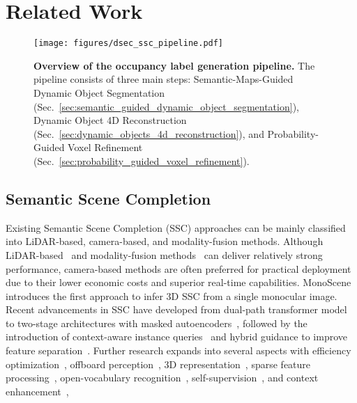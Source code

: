 \section{Related Work}


\begin{figure*}[!t]
\centering
\texttt{[image: figures/dsec\_ssc\_pipeline.pdf]}
\caption{\textbf{Overview of the occupancy label generation pipeline.} The pipeline consists of three main steps: Semantic-Maps-Guided Dynamic Object Segmentation (Sec.~\ref{sec:semantic_guided_dynamic_object_segmentation}), Dynamic Object 4D Reconstruction (Sec.~\ref{sec:dynamic_objects_4d_reconstruction}), and Probability-Guided Voxel Refinement (Sec.~\ref{sec:probability_guided_voxel_refinement}).  
}
\label{fig:dsec_ssc_pipeline}
\end{figure*}

\subsection{Semantic Scene Completion}
Existing Semantic Scene Completion (SSC) approaches can be mainly classified into LiDAR-based, camera-based, and modality-fusion methods.
Although LiDAR-based~\cite{xia2023scpnet,cheng2021s3cnet,yan2021js3c_net,roldao2020lmscnet,jang2024talos,cao2024slcf,peng2022mass} and modality-fusion methods~\cite{pan2024co_occ,ming2024occfusion,lu2024_ipvoxelnet,xue2024bi_ssc,xue2024bi_ssc,liu20242d_guided,ding2024radarocc,zhang2024radocc,cui2024loma} can deliver relatively strong performance, camera-based methods are often preferred for practical deployment due to their lower economic costs and superior real-time capabilities.
%
MonoScene~\cite{cao2022monoscene} introduces the first approach to infer 3D SSC from a single monocular image. 
Recent advancements in SSC have developed from dual-path transformer model~\cite{zhang2023occformer} to two-stage architectures with masked autoencoders~\cite{li2023voxformer}, followed by the introduction of context-aware instance queries~\cite{jiang2024symphonize} and hybrid guidance to improve feature separation~\cite{mei2024sgn,shi2024panossc}.
Further research expands into several aspects with efficiency optimization~\cite{wang2024not,hou2024fastocc,zhao2024lowrankocc,wang2024reliocc,yang2024adaptiveocc}, 
%
offboard perception~\cite{shi2024occfiner,ma2024zopp,zheng2024occworld,ouyang2024linkocc},
%
3D representation~\cite{huang2024gaussianformer,huang2023tpvformer,shi2024occupancy_set_points,xiao2024instance_aware,wang2024opus}, 
sparse feature processing~\cite{tang2024sparseocc,liu2024fully_sparse,wei2023surroundocc}, 
open-vocabulary recognition~\cite{vobecky2024pop_3d,zheng2024veon}, 
self-supervision~\cite{huang2024selfocc,hayler2024s4c}, 
%
and context enhancement~\cite{yu2024cgformer,zhao2024hybridocc,ma2024cotr,li2024htcl,li2024viewformer},
%




